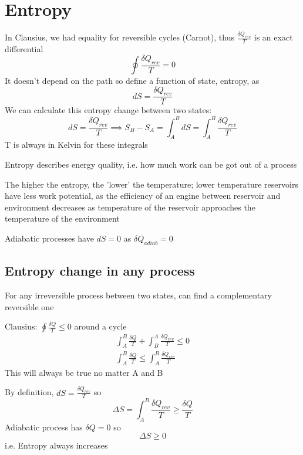 \documentclass[a4paper, 11pt, normalem]{report}
\begin{document}
\section{Entropy}
In Clausius, we had equality for reversible cycles (Carnot), thus $\frac{\delta Q_{rev}}{T}$ is an exact differential
\begin{equation*}
    \oint \frac{\delta Q_{rev}}{T} = 0
\end{equation*}
It doesn't depend on the path so define a function of state, entropy, as
\begin{equation*}
    dS = \frac{\delta Q_{rev}}{T}
\end{equation*}
We can calculate this entropy change between two states:
\begin{equation*}
    dS = \frac{\delta Q_{rev}}{T} \implies S_B - S_A = \int_{A}^{B} dS = \int_{A}^{B} \frac{\delta Q_{rev}}{T}
\end{equation*}
T is always in Kelvin for these integrals

Entropy describes energy quality, i.e. how much work can be got out of a process

The higher the entropy, the 'lower' the temperature; lower temperature reservoirs have less work potential, as the efficiency of an engine between reservoir and environment decreases as temperature of the reservoir approaches the temperature of the environment

Adiabatic processes have $dS = 0$ as $\delta Q_{adiab} = 0$

\subsection{Entropy change in any process}
For any irreversible process between two states, can find a complementary reversible one

Clausius: $\oint \frac{\delta Q}{T} \leq 0$ around a cycle
\begin{gather*}
    \int_{A}^{B} \frac{\delta Q}{T} + \int_{B}^{A} \frac{\delta Q_{rev}}{T} \leq 0 \\
    \int_{A}^{B} \frac{\delta Q}{T} \leq \int_{A}^{B} \frac{\delta Q_{rev}}{T}
\end{gather*}
This will always be true no matter A and B

By definition, $dS = \frac{\delta Q_{rev}}{T}$ so
\begin{equation*}
    \Delta S = \int_{A}^{B} \frac{\delta Q_{rev}}{T} \geq \frac{\delta Q}{T}
\end{equation*}
Adiabatic process has $\delta Q = 0$ so
\begin{equation*}
    \Delta S \geq 0
\end{equation*}
i.e. Entropy always increases
\end{document}
